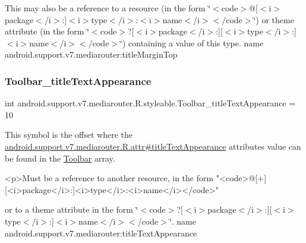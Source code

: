 This may also be a reference to a resource (in the form \char`\"{}$<$code$>$@\mbox{[}$<$i$>$package$<$/i$>$\+:\mbox{]}$<$i$>$type$<$/i$>$\+:$<$i$>$name$<$/i$>$$<$/code$>$\char`\"{}) or theme attribute (in the form \char`\"{}$<$code$>$?\mbox{[}$<$i$>$package$<$/i$>$\+:\mbox{]}\mbox{[}$<$i$>$type$<$/i$>$\+:\mbox{]}$<$i$>$name$<$/i$>$$<$/code$>$\char`\"{}) containing a value of this type.  name android.\+support.\+v7.\+mediarouter\+:title\+Margin\+Top \mbox{\label{classandroid_1_1support_1_1v7_1_1mediarouter_1_1R_1_1styleable_affda7df8edd05728ddd53881bbf3018d}} 
\subsubsection{\texorpdfstring{Toolbar\+\_\+title\+Text\+Appearance}{Toolbar\_titleTextAppearance}}
{\footnotesize\ttfamily int android.\+support.\+v7.\+mediarouter.\+R.\+styleable.\+Toolbar\+\_\+title\+Text\+Appearance = 10\hspace{0.3cm}{\ttfamily [static]}}

This symbol is the offset where the \hyperlink{classandroid_1_1support_1_1v7_1_1mediarouter_1_1R_1_1attr_a4829358bbcfaace73a8abe57ee662d20}{android.\+support.\+v7.\+mediarouter.\+R.\+attr\#title\+Text\+Appearance} attribute\textquotesingle{}s value can be found in the \hyperlink{classandroid_1_1support_1_1v7_1_1mediarouter_1_1R_1_1styleable_a6815cdfaadde30c82b955863af196899}{Toolbar} array.

\begin{DoxyVerb}      <p>Must be a reference to another resource, in the form "<code>@[+][<i>package</i>:]<i>type</i>:<i>name</i></code>"
\end{DoxyVerb}
 or to a theme attribute in the form \char`\"{}$<$code$>$?\mbox{[}$<$i$>$package$<$/i$>$\+:\mbox{]}\mbox{[}$<$i$>$type$<$/i$>$\+:\mbox{]}$<$i$>$name$<$/i$>$$<$/code$>$\char`\"{}.  name android.\+support.\+v7.\+mediarouter\+:title\+Text\+Appearance \mbox{\label{classandroid_1_1support_1_1v7_1_1mediarouter_1_1R_1_1styleable_a2f89f82b7fae914bc2da54aa27c430c8}} 
